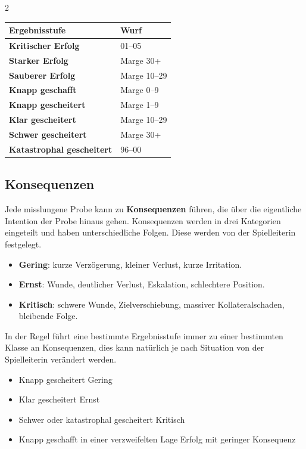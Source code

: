 \begin{multicols*}{2}
\begin{tabular}{ll}
    \toprule
    \textbf{Ergebnisstufe}            & \textbf{Wurf}          \\
    \midrule
    \textbf{Kritischer Erfolg}        & 01--05   \\
    \textbf{Starker Erfolg}           & Marge 30+        \\
    \textbf{Sauberer Erfolg}          & Marge 10--29     \\
    \textbf{Knapp geschafft}          & Marge 0--9       \\
    \textbf{Knapp gescheitert}        & Marge 1--9   \\
    \textbf{Klar gescheitert}         & Marge 10--29 \\
    \textbf{Schwer gescheitert}       & Marge 30+    \\
    \textbf{Katastrophal gescheitert} & 96--00    \\
    \bottomrule
\end{tabular}

\subsection{Konsequenzen}\label{sec:konsequenzen}

Jede misslungene Probe kann zu \textbf{Konsequenzen} führen, die über die eigentliche Intention der Probe hinaus gehen.
Konsequenzen werden in drei Kategorien eingeteilt und haben unterschiedliche Folgen.
Diese werden von der Spielleiterin festgelegt.

\begin{itemize}[leftmargin=*]
\item \textbf{Gering}: kurze Verzögerung, kleiner Verlust, kurze Irritation.
\item \textbf{Ernst}: Wunde, deutlicher Verlust, Eskalation, schlechtere Position.
\item \textbf{Kritisch}: schwere Wunde, Zielverschiebung, massiver Kollateralschaden, bleibende Folge.
\end{itemize}

In der Regel führt eine bestimmte Ergebnisstufe immer zu einer bestimmten Klasse an Konsequenzen, dies kann natürlich je nach Situation von der Spielleiterin verändert werden.

\begin{itemize}[leftmargin=*]
\item Knapp gescheitert \textrightarrow{} Gering
\item Klar gescheitert \textrightarrow{} Ernst
\item Schwer oder katastrophal gescheitert \textrightarrow{} Kritisch
\item Knapp geschafft in einer verzweifelten Lage \textrightarrow{} Erfolg mit geringer Konsequenz
\end{itemize}


\end{multicols*}

